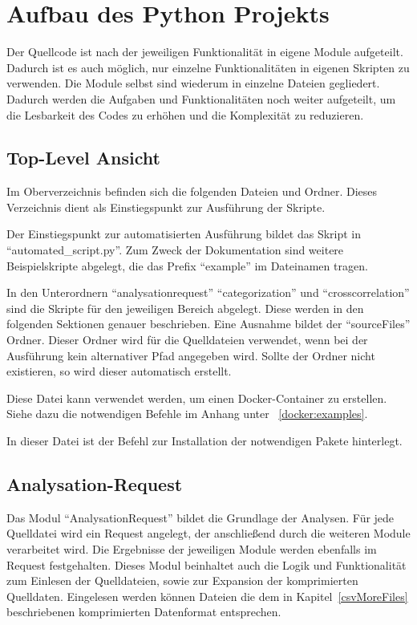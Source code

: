 \section{Aufbau des Python Projekts}
Der Quellcode ist nach der jeweiligen Funktionalität in eigene Module aufgeteilt.
Dadurch ist es auch möglich, nur einzelne Funktionalitäten in eigenen Skripten zu verwenden.
Die Module selbst sind wiederum in einzelne Dateien gegliedert.
Dadurch werden die Aufgaben und Funktionalitäten noch weiter aufgeteilt, um die Lesbarkeit des Codes zu erhöhen und die Komplexität zu reduzieren.

\subsection{Top-Level Ansicht}
Im Oberverzeichnis befinden sich die folgenden Dateien und Ordner. Dieses Verzeichnis dient als Einstiegspunkt zur Ausführung der Skripte.
\begin{description}[style=nextline]
	\item[Skriptdateien] Der Einstiegspunkt zur automatisierten Ausführung bildet das Skript in \enquote{automated\_script.py}. Zum Zweck der Dokumentation sind weitere Beispielskripte abgelegt, die das Prefix \enquote{example} im Dateinamen tragen.
	\item[Unterordner] In den Unterordnern \enquote{analysationrequest} \enquote{categorization} und \enquote{crosscorrelation} sind die Skripte für den jeweiligen Bereich abgelegt. Diese werden in den folgenden Sektionen genauer beschrieben. Eine Ausnahme bildet der \enquote{sourceFiles} Ordner. Dieser Ordner wird für die Quelldateien verwendet, wenn bei der Ausführung kein alternativer Pfad angegeben wird. Sollte der Ordner nicht existieren, so wird dieser automatisch erstellt.
	\item[Docker-File] Diese Datei kann verwendet werden, um einen Docker-Container zu erstellen. Siehe dazu die notwendigen Befehle im Anhang unter ~\ref{docker:examples}.
	\item[Dependencies.txt] In dieser Datei ist der Befehl zur Installation der notwendigen Pakete hinterlegt.
\end{description}

\subsection{Analysation-Request}
Das Modul \enquote{AnalysationRequest} bildet die Grundlage der Analysen.
Für jede Quelldatei wird ein Request angelegt, der anschließend durch die weiteren Module verarbeitet wird.
Die Ergebnisse der jeweiligen Module werden ebenfalls im Request festgehalten.
Dieses Modul beinhaltet auch die Logik und Funktionalität zum Einlesen der Quelldateien, sowie zur Expansion der komprimierten Quelldaten.
Eingelesen werden können Dateien die dem in Kapitel~\ref{csvMoreFiles} beschriebenen komprimierten Datenformat entsprechen.

